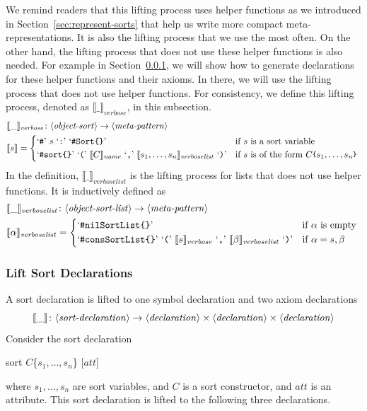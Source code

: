 \documentclass[UTF8,11pt]{article}
\theoremstyle{plain}
\theoremstyle{definition}
\theoremstyle{remark}
\newcommand{\Bracket}[1]{\llbracket#1\rrbracket}
\newcommand{\parametric}[2]{{#1}\raisebox{.2ex}{\texttt{\footnotesize{\{}}}#2\raisebox{.2ex}{\texttt{\footnotesize{\}}}}}
\newcommand{\denote}[1]{\llbracket{#1}\rrbracket}
\newcommand{\sharpsymbol}{\#}
\newcommand{\KSort}{\texttt{\sharpsymbol Sort}}
\newcommand{\quottt}[1]{\textrm{\lq\texttt{#1}\rq}}
\newcommand{\name}{\mathit{name}}
\newcommand{\llist}{\mathit{list}}
\newcommand{\att}{\mathit{att}}
\newcommand{\verbose}{\mathit{verbose}}
\newcommand{\syntacc}[1]{\text{$\langle$\textit{#1}$\rangle$}}
\begin{document}
We remind readers that this lifting process uses helper functions as we 
introduced in Section~\ref{sec:represent-sorts} that help us write more compact 
meta-representations.
It is also the lifting process that we use the most often.
On the other hand, the lifting process that does not use these helper functions 
is also needed.
For example in Section~\ref{sec:lift-sort-decls}, we will show how to generate 
declarations for these helper functions and their axioms.
In there, we will use the lifting process that does not use helper functions.
For consistency, we define this lifting process, denoted as 
$\Bracket{\_}_\verbose$, in this subsection.
\begin{align*}
&\denote{\_}_\verbose \colon \syntacc{object-sort} \to \syntacc{meta-pattern} \\
&\denote{s} = \begin{cases*}
\quottt{\sharpsymbol} \ s \ \quottt{:} \ \quottt{\KSort\{\}} & if $s$ is a 
sort variable \\
\quottt{\sharpsymbol sort\{\}} \
\quottt{(} \ 
\denote{C}_\name \ \quottt{,} \
\denote{s_1,\dots,s_n}_{\verbose\llist} \ 
\quottt{)} & if $s$ 
is of the 
form $\parametric{C}{s_1,\dots,s_n}$
\end{cases*}
\end{align*}
In the definition, $\denote{\_}_{\verbose\llist}$ is the lifting process for 
lists that does not use helper functions.
It is inductively defined as
\begin{align*}
& \denote{\_}_{\verbose\llist} \colon \syntacc{object-sort-list} \to 
\syntacc{meta-pattern} \\
& \denote{\alpha}_{\verbose\llist} = 
\begin{cases*}
\quottt{\sharpsymbol nilSortList\{\}} & if $\alpha$ is empty \\
\quottt{\sharpsymbol consSortList\{\}} \ 
\quottt{(} \ 
\denote{s}_\verbose \ 
\quottt{,} \ 
\denote{\beta}_{\verbose\llist} \ 
\quottt{)} & if 
$\alpha = s,\beta$
\end{cases*}
\end{align*}

\subsubsection{Lift Sort Declarations}
\label{sec:lift-sort-decls}
A sort declaration is lifted to one symbol declaration and two axiom 
declarations
$$ \denote{\_} \colon \syntacc{sort-declaration} \to 
\syntacc{declaration} \times \syntacc{declaration} \times 
\syntacc{declaration}$$
Consider the sort declaration 
\begin{center}
	\ttfamily
	sort $C$\{$s_1,\dots,s_n$\} [$\att$]
\end{center}
where $s_1,\dots,s_n$ are sort variables, and $C$ is a sort constructor, and 
$\att$ is an attribute.
This sort declaration is lifted to the following three declarations.
\end{document}
